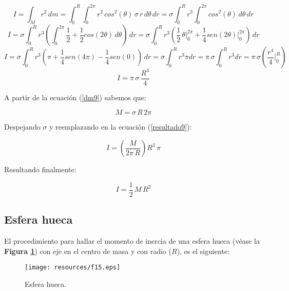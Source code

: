 \documentclass[letter,oneside,11pt]{article}
\begin{document}
\begin{equation*}
    I = \int_{M} r^2\, dm = \int_{0}^{R} \int_{0}^{2\pi} r^2\, cos^2(\theta)\, \sigma\, r\, d\theta\, dr = \sigma \int_{0}^{R} r^3 \int_{0}^{2\pi} cos^2(\theta)\, d\theta\, dr
\end{equation*}
\begin{equation*}
    I = \sigma \int_{0}^{R} r^3 \left( \int_{0}^{2\pi} \frac{1}{2} + \frac{1}{2} cos(2\theta) \, d\theta \right) \, dr = \sigma \int_{0}^{R} r^3 \left( \frac{1}{2}\, \theta \Biggr|_{0}^{2\pi} + \frac{1}{4} sen(2\theta) \Biggr|_{0}^{2\pi} \right) \, dr 
\end{equation*}
\begin{equation*}
    I = \sigma \int_{0}^{R} r^3 \left( \pi + \frac{1}{4} sen(4\pi) - \frac{1}{4} sen(0) \right) \, dr = \sigma \int_{0}^{R} r^3 \pi dr = \pi\, \sigma \int_{0}^{R} r^3 dr = \pi\, \sigma \left( \frac{r^4}{4} \Biggr|_{0}^{R} \right)
\end{equation*}
\begin{equation}
    I = \pi\, \sigma\, \frac{R^4}{4}
\label{resultado9}
\end{equation}

A partir de la ecuación (\ref{dm9}) sabemos que:

\begin{equation*}
    M = \sigma\, R\, 2\pi
\end{equation*}

Despejando $\sigma$ y reemplazando en la ecuación (\ref{resultado9}):

\begin{equation*}
    I = \left( \frac{M}{2\pi\, R} \right) R^3\, \pi
\end{equation*}

Resultando finalmente:

\begin{equation}
    I = \frac{1}{2}\, M\, R^2
\end{equation}

\subsection{Esfera hueca}
El procedimiento para hallar el momento de inercia de una esfera hueca
(véase la \textbf{Figura \ref{figura15}}) con eje en el centro de masa y con
radio ($R$), es el siguiente:

\begin{figure}
\centering
\texttt{[image: resources/f15.eps]}
\caption{Esfera hueca.}
\label{figura15}
\end{figure}
\end{document}

